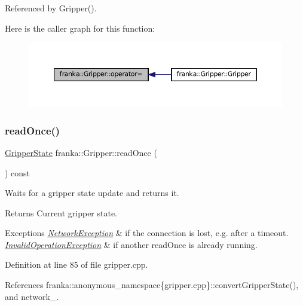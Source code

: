 Referenced by Gripper().

Here is the caller graph for this function\+:
\nopagebreak
\begin{figure}[H]
\begin{center}
\leavevmode
\includegraphics[width=350pt]{classfranka_1_1Gripper_abb64ceecedcb3b2e2bebc262c1589be0_icgraph}
\end{center}
\end{figure}
\mbox{\label{classfranka_1_1Gripper_ab0afc8a41c9c5fff808e76851dcf23ce}} 
\subsubsection{\texorpdfstring{read\+Once()}{readOnce()}}
{\footnotesize\ttfamily \hyperlink{structfranka_1_1GripperState}{Gripper\+State} franka\+::\+Gripper\+::read\+Once (\begin{DoxyParamCaption}{ }\end{DoxyParamCaption}) const}

Waits for a gripper state update and returns it.

\begin{DoxyReturn}{Returns}
Current gripper state.
\end{DoxyReturn}

\begin{DoxyExceptions}{Exceptions}
{\em \hyperlink{structfranka_1_1NetworkException}{Network\+Exception}} & if the connection is lost, e.\+g. after a timeout. \\
\hline
{\em \hyperlink{structfranka_1_1InvalidOperationException}{Invalid\+Operation\+Exception}} & if another read\+Once is already running. \\
\hline
\end{DoxyExceptions}


Definition at line 85 of file gripper.\+cpp.



References franka\+::anonymous\+\_\+namespace\{gripper.\+cpp\}\+::convert\+Gripper\+State(), and network\+\_\+.



